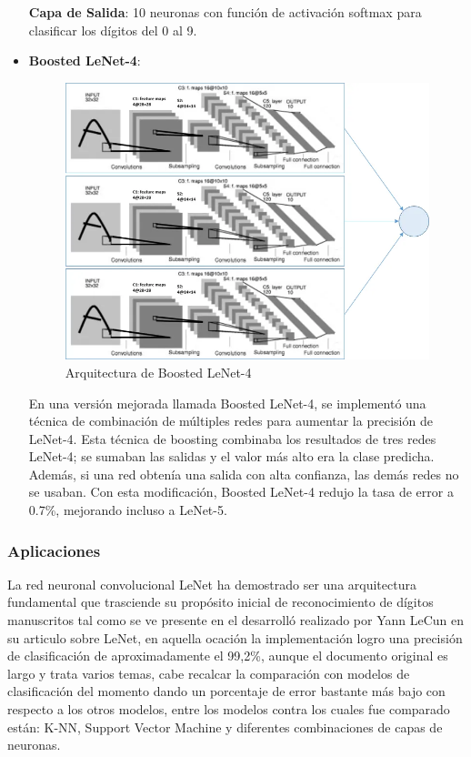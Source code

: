 \begin{itemize}
    \textbf{Capa de Salida}: 10 neuronas con función
    de activación softmax para clasificar los dígitos del 0 al 9.

    \space

    \item \textbf{Boosted LeNet-4}:
    
    \begin{figure}[htbp]
        \centering
        \includegraphics[width=\linewidth]{src/figures/lenet_4_boosted.png}
        \caption{Arquitectura de Boosted LeNet-4 \cite{LeNet_4_boosted}}
        \label{fig:boosted_lenet_4}
    \end{figure}

    En una versión mejorada llamada Boosted LeNet-4, se implementó 
    una técnica de combinación de múltiples redes para aumentar 
    la precisión de LeNet-4. Esta técnica de boosting combinaba los 
    resultados de tres redes LeNet-4; se sumaban las salidas y el 
    valor más alto era la clase predicha. Además, si una red obtenía 
    una salida con alta confianza, las demás redes no se usaban. 
    Con esta modificación, Boosted LeNet-4 redujo la tasa de error 
    a 0.7\%, mejorando incluso a LeNet-5.

\end{itemize}

\subsubsection{Aplicaciones}

La red neuronal convolucional LeNet ha demostrado ser una 
arquitectura fundamental que trasciende su propósito inicial 
de reconocimiento de dígitos manuscritos tal como se ve presente
en el desarrolló realizado por Yann LeCun en su articulo sobre LeNet,
en aquella ocación la implementación logro una precisión de 
clasificación de aproximadamente el 99,2\%, aunque el documento 
original es largo y trata varios temas, cabe recalcar la comparación
con modelos de clasificación del momento dando un porcentaje de 
error bastante más bajo con respecto a los otros modelos, entre los
modelos contra los cuales fue comparado están: K-NN, Support Vector
Machine y diferentes combinaciones de capas de neuronas. 

